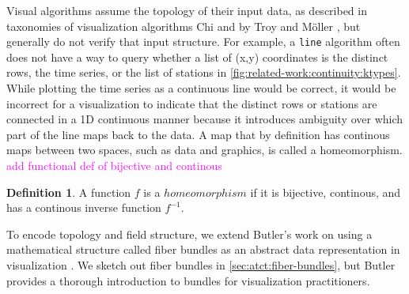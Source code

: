 \documentclass[journal]{IEEEtran}
\newcommand{\note}[1]{\textcolor{magenta}{#1}}
\theoremstyle{definition}
\newtheorem{definition}{Definition}[section]
\theoremstyle{remark}
\begin{document}
Visual algorithms assume the topology of their input data, as described in taxonomies of visualization algorithms Chi\cite{chiTaxonomyVisualizationTechniques2000} and by Troy and M\"{o}ller \cite{toryRethinkingVisualizationHighlevel2004}, but generally do not verify that input structure. For example, a \texttt{line} algorithm often does not have a way to query whether a list of (x,y) coordinates is the distinct rows, the time series, or the list of stations in \autoref{fig:related-work:continuity:ktypes}. While plotting the time series as a continuous line would be correct, it would be incorrect for a visualization to indicate that the distinct rows or stations are connected in a 1D continuous manner because it introduces ambiguity over which part of the line maps back to the data. A map that by definition has continous maps between two spaces, such as data and graphics, is called a homeomorphism\cite{riehlCategoryTheoryContext}.
\note{add functional def of bijective and continous
}
\begin{definition}
  A function $f$ is a $homeomorphism$ if it is bijective, continous, and has a continous inverse function $f^{-1}$.
\end{definition}

To encode topology and field structure, we extend Butler's work on using a mathematical structure called fiber bundles as an abstract data representation in visualization \cite{butlerVectorBundleClassesForm1992, butlerVisualizationModelBased1989}. We sketch out fiber bundles in \autoref{sec:atct:fiber-bundles}, but Butler provides a thorough introduction to bundles for visualization practitioners.
\end{document}
